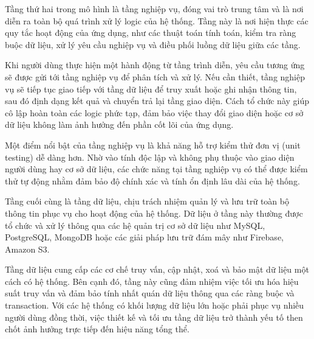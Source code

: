   \begin{flushleft}
  \hspace*{0.8cm}Tầng thứ hai trong mô hình là tầng nghiệp vụ, đóng vai trò trung tâm và là nơi diễn ra toàn bộ quá trình xử lý logic của hệ thống. Tầng này là nơi hiện thực các quy tắc hoạt động của ứng dụng, như các thuật toán tính toán, kiểm tra ràng buộc dữ liệu, xử lý yêu cầu nghiệp vụ và điều phối luồng dữ liệu giữa các tầng.
  \end{flushleft}
  
  \begin{flushleft}
  \hspace*{0.8cm}Khi người dùng thực hiện một hành động từ tầng trình diễn, yêu cầu tương ứng sẽ được gửi tới tầng nghiệp vụ để phân tích và xử lý. Nếu cần thiết, tầng nghiệp vụ sẽ tiếp tục giao tiếp với tầng dữ liệu để truy xuất hoặc ghi nhận thông tin, sau đó định dạng kết quả và chuyển trả lại tầng giao diện. Cách tổ chức này giúp cô lập hoàn toàn các logic phức tạp, đảm bảo việc thay đổi giao diện hoặc cơ sở dữ liệu không làm ảnh hưởng đến phần cốt lõi của ứng dụng.
  \end{flushleft}
  
  \begin{flushleft}
  \hspace*{0.8cm}Một điểm nổi bật của tầng nghiệp vụ là khả năng hỗ trợ kiểm thử đơn vị (unit testing) dễ dàng hơn. Nhờ vào tính độc lập và không phụ thuộc vào giao diện người dùng hay cơ sở dữ liệu, các chức năng tại tầng nghiệp vụ có thể được kiểm thử tự động nhằm đảm bảo độ chính xác và tính ổn định lâu dài của hệ thống.
  \end{flushleft}
  
  \begin{flushleft}
  \hspace*{0.8cm}Tầng cuối cùng là tầng dữ liệu, chịu trách nhiệm quản lý và lưu trữ toàn bộ thông tin phục vụ cho hoạt động của hệ thống. Dữ liệu ở tầng này thường được tổ chức và xử lý thông qua các hệ quản trị cơ sở dữ liệu như MySQL, PostgreSQL, MongoDB hoặc các giải pháp lưu trữ đám mây như Firebase, Amazon S3.
  \end{flushleft}
  
  \begin{flushleft}
  \hspace*{0.8cm}Tầng dữ liệu cung cấp các cơ chế truy vấn, cập nhật, xoá và bảo mật dữ liệu một cách có hệ thống. Bên cạnh đó, tầng này cũng đảm nhiệm việc tối ưu hóa hiệu suất truy vấn và đảm bảo tính nhất quán dữ liệu thông qua các ràng buộc và transaction. Với các hệ thống có khối lượng dữ liệu lớn hoặc phải phục vụ nhiều người dùng đồng thời, việc thiết kế và tối ưu tầng dữ liệu trở thành yếu tố then chốt ảnh hưởng trực tiếp đến hiệu năng tổng thể.
  \end{flushleft}
  
